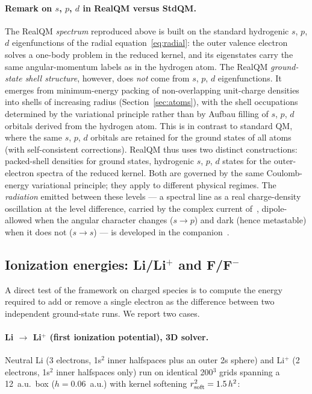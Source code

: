 \documentclass[11pt]{article}
\begin{document}
\paragraph{Remark on $s$, $p$, $d$ in RealQM versus StdQM.}
The RealQM \emph{spectrum} reproduced above is built on the standard hydrogenic $s$, $p$, $d$ eigenfunctions of the radial equation~\eqref{eq:radial}: the outer valence electron solves a one-body problem in the reduced kernel, and its eigenstates carry the same angular-momentum labels as in the hydrogen atom. The RealQM \emph{ground-state shell structure}, however, does \emph{not} come from $s$, $p$, $d$ eigenfunctions. It emerges from minimum-energy packing of non-overlapping unit-charge densities into shells of increasing radius (Section~\ref{sec:atoms}), with the shell occupations determined by the variational principle rather than by Aufbau filling of $s$, $p$, $d$ orbitals derived from the hydrogen atom. This is in contrast to standard QM, where the same $s$, $p$, $d$ orbitals are retained for the ground states of all atoms (with self-consistent corrections). RealQM thus uses two distinct constructions: packed-shell densities for ground states, hydrogenic $s$, $p$, $d$ states for the outer-electron spectra of the reduced kernel. Both are governed by the same Coulomb-energy variational principle; they apply to different physical regimes.
The \emph{radiation} emitted between these levels --- a spectral line as a real charge-density oscillation at
the level difference, carried by the complex current of~\cite{ComplexRealQM}, dipole-allowed when the angular
character changes ($s\to p$) and dark (hence metastable) when it does not ($s\to s$) --- is developed in the
companion~\cite{Spectra}.

\subsection{Ionization energies: Li/Li$^+$ and F/F$^-$}\label{sec:ions}

A direct test of the framework on charged species is to compute the energy required to add or remove a single electron as the difference between two independent ground-state runs. We report two cases.

\paragraph{Li $\to$ Li$^+$ (first ionization potential), 3D solver.}
Neutral Li (3 electrons, 1s$^2$ inner halfspaces plus an outer 2s sphere) and Li$^+$ (2 electrons, 1s$^2$ inner halfspaces only) run on identical 200$^3$ grids spanning a 12~a.u.\ box ($h = 0.06$~a.u.) with kernel softening $r_{\rm soft}^2 = 1.5\,h^2$:
\end{document}
